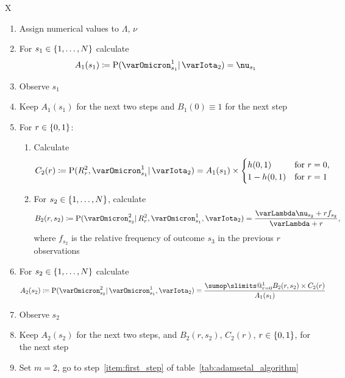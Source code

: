 \documentclass[\ifafour a4paper,12pt,\else a5paper,10pt,\fi%
onecolumn,oneside,article,%
british%
]{memoir}
\makeatletter
\theoremstyle{remark}
\theoremstyle{innote}
\def\sum{\DOTSI\sumop\slimits@}
\newcommand*{\defd}{\coloneqq}
\DeclarePairedDelimiter\set{\{}{\}}
\newcommand*{\p}{\mathrm{P}}%
\renewcommand*{\|}{\mathpunct{|}}
\newcommand*{\yff}{f}
\newcommand*{\yI}{\varIota}
\newcommand*{\yMc}{\yI_2}
\newcommand*{\yN}{\varLambda}
\newcommand*{\ynn}{\nu}
\newcommand*{\yrs}{h}
\makeatother
\begin{document}
\begin{table}[!p]
  \centering
  \caption{Initial steps of predictive algorithm}
  \label{tab:adamsetal_initial}
  \begin{tabularx}{\textwidth}{X}\hline
    \begin{enumerate}%
    \item Assign numerical values to $\yN$, $\ynn$
    \item For $s_1 \in \set{1,\dotsc,N}$ calculate
      \[A_1(s_1)\defd \p(\varOmicron^{1}_{s_{1}} \|  \yMc) =\ynn_{s_1} \]
    \item Observe $s_1$
    \item Keep  $A_1(s_1)$ for the next two steps and $B_1(0)\equiv 1$ for
      the next step

      \bigskip
    \item For $r \in\set{0,1}$:
      \begin{enumerate}[label*=\arabic*.]
   \item Calculate
      \[
        C_2(r) \defd \p(R^{2}_{r}, \varOmicron^{1}_{s_1} \| \yMc)
        =
A_1(s_1) \times \begin{cases}
          \yrs(0,1) &\text{for $r=0$},\\ 1-\yrs(0,1)&\text{for $r=1$}
        \end{cases}
      \]
      \item For $s_{2} \in \set{1,\dotsc,N}$, calculate
        \[ 
          B_{2}(r,s_{2}) \defd
          \p(\varOmicron^{2}_{s_{2}} \| R^{2}_{r}, \varOmicron^{1}_{s_{1}}, \yMc) =
         \frac{\yN\ynn_{s_{2}}+r\yff_{s_{2}}}{\yN + r},
        \]
     where $\yff_{s_{2}}$ is the relative frequency of outcome $s_{3}$ in
     the previous $r$ observations
    \end{enumerate}
  \item  For $s_2 \in \set{1,\dotsc,N}$ calculate
      \[A_2(s_2) \defd
        \p(\varOmicron^{2}_{s_{2}} \| \varOmicron^{1}_{s_{1}}, \yMc) =
\frac{\sum_{r=0}^{1} B_{2}(r,s_{2}) \times C_{2}(r)}{A_{1}(s_{1})} \]
\item Observe $s_2$
\item Keep $A_{2}(s_{2})$ for the next two steps, and
  $B_{2}(r,s_{2})$, $C_{2}(r)$, $r\in\set{0,1}$, for the next step
\item Set $m=2$, go to step~\ref{item:first_step} of table~\ref{tab:adamsetal_algorithm}
\end{enumerate}
\\\hline
  \end{tabularx}
\end{table}
\end{document}
